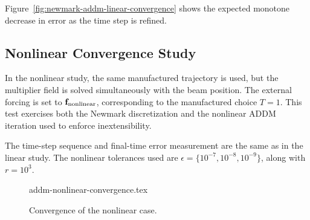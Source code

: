 Figure~\ref{fig:newmark-addm-linear-convergence} shows the expected monotone
decrease in error as the time step is refined.

\subsection{Nonlinear Convergence Study}

In the nonlinear study, the same manufactured trajectory is used, but the
multiplier field is solved simultaneously with the beam position. The external
forcing is set to \(\vec f_{\rm nonlinear}\), corresponding to the manufactured
choice \(T=1\). This test exercises both the Newmark discretization and the
nonlinear ADDM iteration used to enforce inextensibility.

The time-step sequence and final-time error measurement are the same as in the
linear study. The nonlinear tolerances used are \(\epsilon =
\{10^{-7},10^{-8},10^{-9}\}\), along with \(r=10^3\).


\begin{figure}[H]
    \centering
    {addm-nonlinear-convergence.tex}
    \caption{Convergence of the nonlinear case.}
    \label{fig:newmark-addm-nonlinear-convergence}
\end{figure}

